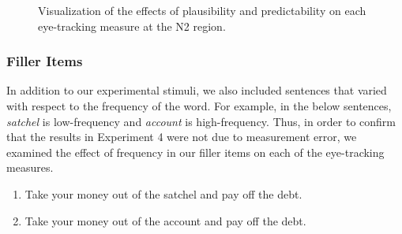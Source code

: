 \documentclass[
  12pt,
  letterpaper,
]{scrreprt}
\begin{document}
\begin{figure}[htbp]

\caption{\label{fig-fullmodelresultsn2}Visualization of the effects of
plausibility and predictability on each eye-tracking measure at the N2
region.}


\end{figure}%

\subsubsection{Filler Items}\label{filler-items}

In addition to our experimental stimuli, we also included sentences that
varied with respect to the frequency of the word. For example, in the
below sentences, \emph{satchel} is low-frequency and \emph{account} is
high-frequency. Thus, in order to confirm that the results in Experiment
4 were not due to measurement error, we examined the effect of frequency
in our filler items on each of the eye-tracking measures.

\begin{enumerate} 

    \item Take your money out of the satchel and pay off the debt.
    \item Take your money out of the account and pay off the debt.
    
\end{enumerate}
\end{document}
